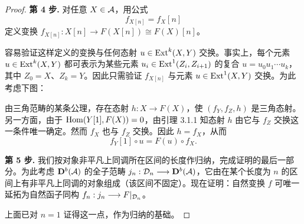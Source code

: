 \begin{proof}
\textbf{第 4 步.} 对任意 $X\in\mathcal{A}$，用公式
\begin{equation*}
f_{X[n]}=f_X[n]
\end{equation*}
定义变换 $f_{X[n]}:X[n]\longrightarrow F(X[n])\cong F(X)[n]$。

容易验证这样定义的变换与任何态射 $u\in\operatorname{Ext}^{k}(X,Y)$ 交换。事实上，每个元素 $u\in\operatorname{Ext}^{k}(X,Y)$ 都可表示为某些元素 $u_i\in\operatorname{Ext}^{1}(Z_i,Z_{i+1})$ 的复合 $u=u_0u_1\cdots u_k$，其中 $Z_0=X$、$Z_k=Y$。因此只需验证 $f_{X[n]}$ 与元素 $u\in\operatorname{Ext}^{1}(X,Y)$ 交换。为此考虑下图：
\begin{center}
\end{center}
由三角范畴的某条公理，存在态射 $h:X\longrightarrow F(X)$，使 $(f_Y,f_Z,h)$ 是三角态射。另一方面，由于 $\operatorname{Hom}(Y[1],F(X))=0$，由引理 3.1.1 知态射 $h$ 由它与 $f_Z$ 交换这一条件唯一确定。然而 $f_X$ 也与 $f_Z$ 交换。因此 $h=f_X$，从而
\begin{equation*}
f_Y[1]\circ u=F(u)\circ f_X.
\end{equation*}

\textbf{第 5 步.} 我们按对象非平凡上同调所在区间的长度作归纳，完成证明的最后一部分。为此考虑 $\mathbf{D}^{b}(\mathcal{A})$ 的全子范畴 $j_n:\mathcal{D}_n\longrightarrow\mathbf{D}^{b}(\mathcal{A})$，它由在某个长度为 $n$ 的区间上有非平凡上同调的对象组成（该区间不固定）。现在证明：自然变换 $f$ 可唯一延拓为自然函子同构 $f_n:j_n\longrightarrow F|_{\mathcal{D}_n}$。

上面已对 $n=1$ 证得这一点，作为归纳的基础。


\end{proof}
